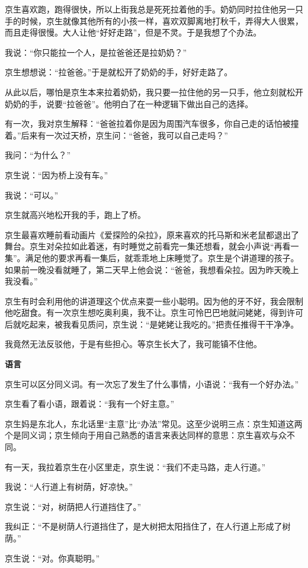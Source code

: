 \documentclass[twoside,openright,headings=optiontohead]{ctexbook} %
\begin{document}
{京生喜欢跑，跑得很快，所以上街我总是死死拉着他的手。奶奶同时拉住他另一只手的时候，京生就像其他所有的小孩一样，喜欢双脚离地打秋千，弄得大人很累，而且走得很慢。大人让他``好好走路''，但是不灵。于是我想了个办法。

我说：``你只能拉一个人，是拉爸爸还是拉奶奶？''

京生想想说：``拉爸爸。''于是就松开了奶奶的手，好好走路了。

从此以后，哪怕是京生本来拉着奶奶，我只要一拉住他的另一只手，他立刻就松开奶奶的手，说要``拉爸爸''。他明白了在一种逻辑下做出自己的选择。

有一次，我对京生解释：``爸爸拉着你是因为周围汽车很多，你自己走的话怕被撞着。''后来有一次过天桥，京生问：``爸爸，我可以自己走吗？''

我问：``为什么？''

京生说：``因为桥上没有车。''

我说：``可以。''

京生就高兴地松开我的手，跑上了桥。

京生最喜欢睡前看动画片《爱探险的朵拉》，原来喜欢的托马斯和米老鼠都退出了舞台。京生对朵拉如此着迷，有时睡觉之前看完一集还想看，就会小声说``再看一集''。满足他的要求再看一集后，就乖乖地上床睡觉了。京生是个讲道理的孩子。如果前一晚没看就睡了，第二天早上他会说：``爸爸，我想看朵拉。因为昨天晚上我没看。''

京生有时会利用他的讲道理这个优点来耍一些小聪明。因为他的牙不好，我会限制他吃甜食。有一次京生想吃奥利奥，我不让。京生可怜巴巴地就问姥姥，得到许可后就吃起来，被我看见质问，京生说：``是姥姥让我吃的。''把责任推得干干净净。

我竟然无法反驳他，于是有些担心。等京生长大了，我可能镇不住他。

\textbf{语言}

京生可以区分同义词。有一次忘了发生了什么事情，小语说：``我有一个好办法。''

京生看了看小语，跟着说：``我有一个好主意。''

京生妈是东北人，东北话里``主意''比``办法''常见。这至少说明三点：京生知道这两个是同义词；京生倾向于用自己熟悉的语言来表达同样的意思：京生喜欢与众不同。

有一天，我拉着京生在小区里走，京生说：``我们不走马路，走人行道。''

我说：``人行道上有树荫，好凉快。''

京生说：``对，树荫把人行道挡住了。''

我纠正：``不是树荫人行道挡住了，是大树把太阳挡住了，在人行道上形成了树荫。''

京生说：``对。你真聪明。''

}
\end{document}
